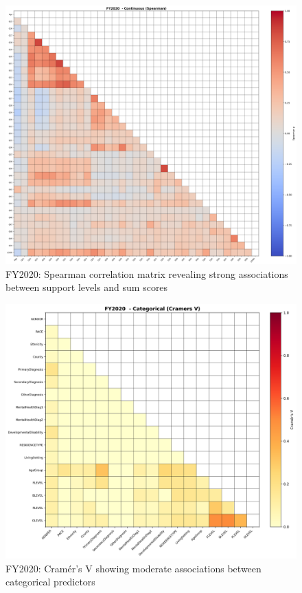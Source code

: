 \vspace*{\fill}
\begin{figure}[htbp]
\centering
\includegraphics[width=\textwidth]{fy2020_continuous_spearman.png}
\caption{FY2020: Spearman correlation matrix revealing strong associations between support levels and sum scores}
\end{figure}
\vspace*{\fill}

\newpage

\vspace*{\fill}
\begin{figure}[h]
\centering
\includegraphics[width=\textwidth]{fy2020_categorical_cramers_v.png}
\caption{FY2020: Cramér's V showing moderate associations between categorical predictors}
\end{figure}
\vspace*{\fill}

